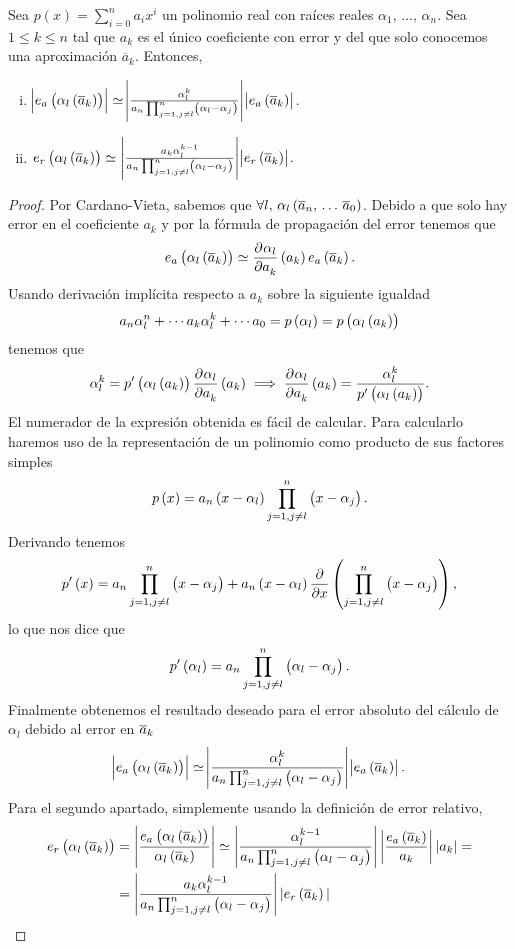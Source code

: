 \begin{prop}
  Sea $p(x)=\sum\limits_{i=0}^{n} a_ix^i$ un polinomio real con raíces reales $\alpha_1,\,\dots,\,\alpha_n$. Sea $1\leq k\leq n$ tal que $a_k$ es el único coeficiente con error y del que solo conocemos una aproximación $\overline{a}_k$. Entonces,
  \begin{enumerate}[i)]
    \item $\abs{e_a\left( \alpha_l\left( \overline{a}_k\right) \right)} \simeq \abs{\frac{\alpha_l^k}{ a_n\prod_{j=1,j\neq l}^{n}\left( \alpha_l-\alpha_j\right) }}\abs{e_a\left( \overline{a}_k\right)}$.
    \item $e_r\left( \alpha_l\left( \overline{a}_k\right) \right) \simeq \left|\frac{a_k\alpha_l^{k-1}}{a_n\prod_{j=1,j\neq l}^{n}\left( \alpha_l-\alpha_j\right) }\right| \abs{e_r\left( \overline{a}_k\right)}$.
  \end{enumerate}
\end{prop}
\begin{proof}
  Por Cardano-Vieta, sabemos que $\forall l,\, \alpha_l\left(\overline{a}_n,\,\dots\,\overline{a}_0\right)$. Debido a que solo hay error en el coeficiente $a_k$ y por la fórmula de propagación del error tenemos que
  \[
    e_a\left( \alpha_l\left( \overline{a}_k\right) \right)  \simeq \frac{\partial^{} \alpha_l}{\partial a_k^{}}\left( a_k\right) e_a\left( \overline{a}_k\right) .
  \]
  Usando derivación implícita respecto a $a_k$ sobre la siguiente igualdad
  \[
     a_n\alpha_l^n + \cdots a_k\alpha_l^k + \cdots a_0 = p\left( \alpha_l\right)  = p\left( \alpha_l\left( a_k\right) \right) 
  \]
  tenemos que
  \[
    \alpha_l^k = p'\left( \alpha_l\left( a_k\right) \right) \frac{\partial^{} \alpha_l}{\partial a_k^{}}\left( a_k\right)  \implies \frac{\partial^{} \alpha_l}{\partial a_k^{}}\left( a_k\right)  = \dfrac{\alpha_l^k}{p'\left( \alpha_l\left( a_k\right) \right)}.
  \]
  El numerador de la expresión obtenida es fácil de calcular. Para calcularlo  haremos uso de la representación de un polinomio como producto de sus factores simples
  \[
      p\left( x\right) = a_n\left( x-\alpha_l\right) \prod_{j=1,j\neq l}^{n}\left( x-\alpha_j\right).
  \]
  Derivando tenemos
  \[
    p'\left( x\right)  = a_n\prod_{j=1,j\neq l}^{n}\left( x-\alpha_j\right)  + a_n\left( x-\alpha_l\right) \frac{\partial}{\partial x}\left( \prod_{j=1,j\neq l}^{n}\left( x-\alpha_j\right)\right),
  \]
  lo que nos dice que
  \[
    p'\left( \alpha_l\right) = a_n\prod_{j=1,j\neq l}^{n}\left( \alpha_l-\alpha_j\right).
  \]
  Finalmente obtenemos el resultado deseado para el error absoluto del cálculo de $\alpha_l$ debido al error en $\overline{a}_k$
  \[
    \abs{e_a\left( \alpha_l\left( \overline{a}_k\right) \right)} \simeq \abs{\frac{\alpha_l^k}{ a_n\prod_{j=1,j\neq l}^{n}\left( \alpha_l-\alpha_j\right) }}\abs{e_a\left( \overline{a}_k\right)}.
  \]
  Para el segundo apartado, simplemente usando la definición de error relativo,
  \begin{align*}
    e_r\left( \alpha_l\left( \overline{a}_k\right) \right) & = \left|\frac{e_a\left( \alpha_l\left( \overline{a}_k\right) \right) }{\alpha_l\left( \overline{a}_k\right) }\right| \simeq \left|\frac{\alpha_l^{k-1}}{ a_n\prod_{j=1,j\neq l}^{n}\left( \alpha_l-\alpha_j\right) }\right|\left|\frac{e_a\left( \overline{a}_k\right) }{a_k}\right||a_k|=\\
           & = \left|\frac{a_k\alpha_l^{k-1}}{a_n\prod_{j=1,j\neq l}^{n}\left( \alpha_l-\alpha_j\right) }\right| |e_r\left( \overline{a}_k\right) |
  \end{align*}


\end{proof}

